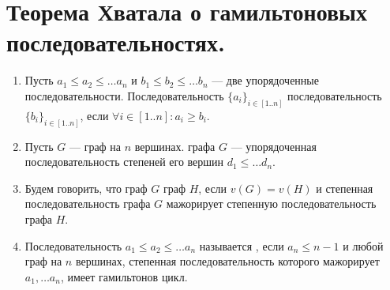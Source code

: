 \section{Теорема Хватала о гамильтоновых последовательностях.}
\begin{definition}
	\begin{enumerate}
		\item Пусть $a_1 \le a_2 \le  \ldots a_n$ и $b_1 \le b_2 \le \ldots b_n$ --- две упорядоченные последовательности. Последовательность $\{a_i\}_{i \in [1..n]}$  последовательность $\{b_i\}_{i \in [1..n]}$, если $ \forall i \in  [1..n]\colon a_i \ge b_i$.
		\item Пусть $G$ --- граф на $n$ вершинах.  графа $G$ --- упорядоченная последовательность степеней его вершин $d_1 \le \ldots d_n$. 
		\item Будем говорить, что граф $G$  граф $H$, если $v(G) = v(H)$ и степенная последовательность графа $G$ мажорирует степенную последовательность графа $H$.
		\item Последовательность  $a_1 \le a_2 \le \ldots a_n$ называется , если $a_n \le n-1$ и любой граф на $n$ вершинах, степенная последовательность которого мажорирует $a_1, \ldots a_n$, имеет гамильтонов цикл.
	\end{enumerate}
\end{definition}


